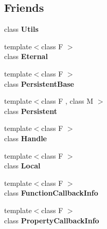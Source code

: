 \subsection*{Friends}
\begin{DoxyCompactItemize}
\item 
\hypertarget{classv8_1_1Local_abc0f7da619e9e72510dc07ed7b5ff6d8}{}class {\bfseries Utils}\label{classv8_1_1Local_abc0f7da619e9e72510dc07ed7b5ff6d8}

\item 
\hypertarget{classv8_1_1Local_adf5d8780aceb9310fb1246aae7ec348e}{}{\footnotesize template$<$class F $>$ }\\class {\bfseries Eternal}\label{classv8_1_1Local_adf5d8780aceb9310fb1246aae7ec348e}

\item 
\hypertarget{classv8_1_1Local_abb172e0bb22fc5fed7a3a66f29d046ce}{}{\footnotesize template$<$class F $>$ }\\class {\bfseries Persistent\+Base}\label{classv8_1_1Local_abb172e0bb22fc5fed7a3a66f29d046ce}

\item 
\hypertarget{classv8_1_1Local_ad845ec8872174be0a9ca9a3dd1898d30}{}{\footnotesize template$<$class F , class M $>$ }\\class {\bfseries Persistent}\label{classv8_1_1Local_ad845ec8872174be0a9ca9a3dd1898d30}

\item 
\hypertarget{classv8_1_1Local_a67ca1a2d91273eaf85fb3d23ba8ce984}{}{\footnotesize template$<$class F $>$ }\\class {\bfseries Handle}\label{classv8_1_1Local_a67ca1a2d91273eaf85fb3d23ba8ce984}

\item 
\hypertarget{classv8_1_1Local_afb872edb4aac7ba55f0da004113aa2b0}{}{\footnotesize template$<$class F $>$ }\\class {\bfseries Local}\label{classv8_1_1Local_afb872edb4aac7ba55f0da004113aa2b0}

\item 
\hypertarget{classv8_1_1Local_a76786e6fa2d0eac5e2d4f647659d0d23}{}{\footnotesize template$<$class F $>$ }\\class {\bfseries Function\+Callback\+Info}\label{classv8_1_1Local_a76786e6fa2d0eac5e2d4f647659d0d23}

\item 
\hypertarget{classv8_1_1Local_a5018adab21fade2b42f4f60e45fa1083}{}{\footnotesize template$<$class F $>$ }\\class {\bfseries Property\+Callback\+Info}\label{classv8_1_1Local_a5018adab21fade2b42f4f60e45fa1083}


\end{DoxyCompactItemize}
